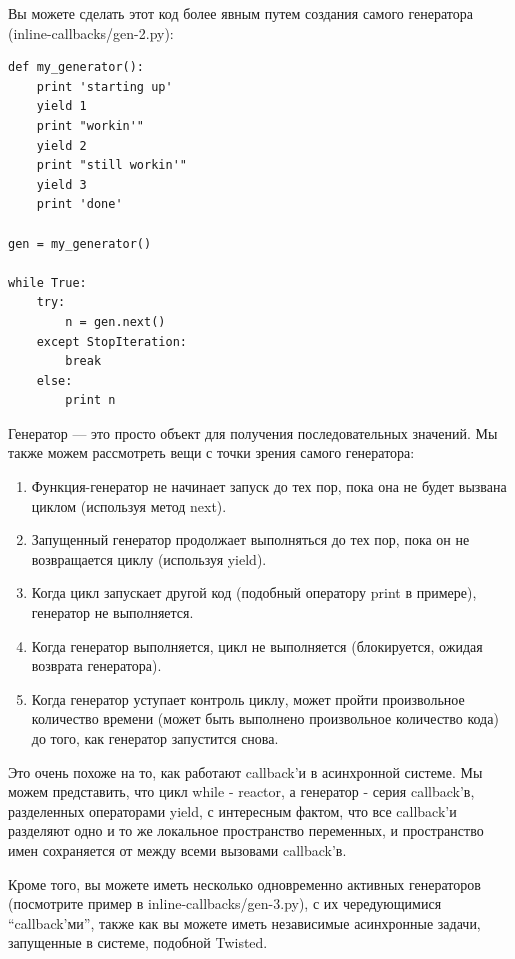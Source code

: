 Вы можете сделать этот код более явным 
путем создания самого генератора (inline-callbacks/gen-2.py):

\begin{scriptsize}\begin{verbatim}
def my_generator():
    print 'starting up'
    yield 1
    print "workin'"
    yield 2
    print "still workin'"
    yield 3
    print 'done'

gen = my_generator()

while True:
    try:
        n = gen.next()
    except StopIteration:
        break
    else:
        print n
\end{verbatim}\end{scriptsize}


Генератор --- это просто объект для получения последовательных значений. 
Мы также можем рассмотреть вещи с точки зрения самого генератора:

\begin{enumerate}
\item Функция-генератор не начинает запуск до тех пор, пока она не 
будет вызвана циклом (используя метод next).
\item Запущенный генератор продолжает выполняться до тех пор, пока 
он не возвращается циклу (используя yield). 
\item Когда цикл запускает другой код (подобный оператору print в примере), 
генератор не выполняется.
\item Когда генератор выполняется, цикл не выполняется (блокируется, ожидая возврата генератора).
\item Когда генератор уступает контроль циклу, может пройти произвольное 
количество времени (может быть выполнено произвольное количество кода) до того, 
как генератор запустится снова.
\end{enumerate}


Это очень похоже на то, как работают callback'и в асинхронной системе. 
Мы можем представить, что цикл while - reactor, а 
генератор - серия callback'в, разделенных операторами yield, 
с интересным фактом, что все callback'и разделяют одно и то же 
локальное пространство переменных, и пространство имен сохраняется 
от между всеми вызовами callback'в.


Кроме того, вы можете иметь несколько одновременно активных генераторов 
(посмотрите пример в inline-callbacks/gen-3.py), 
с их чередующимися ``callback'ми'', 
также как вы можете иметь независимые асинхронные задачи, 
запущенные в системе, подобной Twisted.



